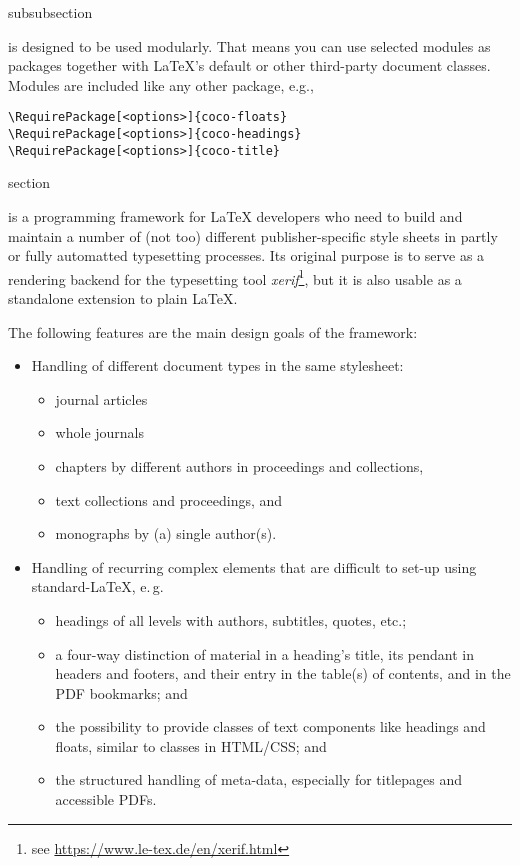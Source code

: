 \begin{Heading}[label=sec:modules]{subsubsection}
\end{Heading}

{\CoCoTeX} is designed to be used modularly. That means you can use
selected modules as packages together with \LaTeX's default or other
third-party document classes. Modules are included like any other
package, e.g.,
\begin{lstlisting}[style=tex]
\RequirePackage[<options>]{coco-floats}
\RequirePackage[<options>]{coco-headings}
\RequirePackage[<options>]{coco-title}
\end{lstlisting}

\begin{Heading}{section}
\end{Heading}

{\CoCoTeX} is a programming framework for {\LaTeX} developers who need
to build and maintain a number of (not too) different
publisher-specific style sheets in partly or fully automatted
typesetting processes. Its original purpose is to serve as a rendering
backend for the typesetting tool \textit{xerif}\footnote{see
  \url{https://www.le-tex.de/en/xerif.html}}, but it is also usable as
a standalone extension to plain {\LaTeX}.

The following features are the main design goals of the {\CoCoTeX}
framework:
\begin{itemize}
\item Handling of different document types in the same stylesheet:
  \begin{itemize}
  \item journal articles
  \item whole journals
  \item chapters by different authors in proceedings and collections,
  \item text collections and proceedings, and
  \item monographs by (a) single author(s).
  \end{itemize}
\item Handling of recurring complex elements that are difficult to
  set-up using standard-\LaTeX, e.\,g.
  \begin{itemize}
  \item headings of all levels with authors, subtitles, quotes, etc.;
  \item a four-way distinction of material in a heading's title, its
    pendant in headers and footers, and their entry in the table(s) of
    contents, and in the PDF bookmarks; and
  \item the possibility to provide classes of text components like
    headings and floats, similar to classes in HTML/CSS; and
  \item the structured handling of meta-data, especially for
    titlepages and accessible PDFs.
  \end{itemize}
\end{itemize}

